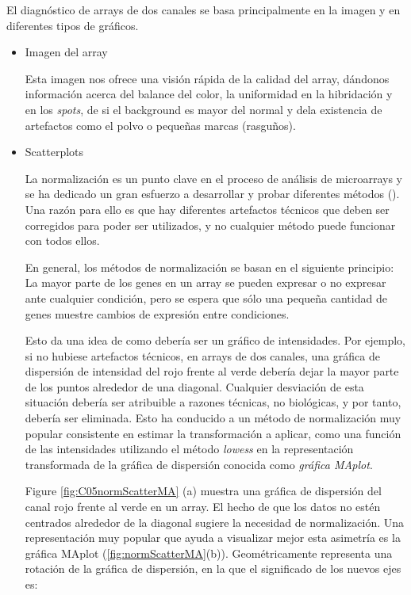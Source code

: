 El diagn\'ostico de arrays de dos canales se basa principalmente
en la imagen y en diferentes tipos de gr\'aficos.

\begin{itemize}
 \item Imagen del array

Esta imagen nos ofrece una visi\'on r\'apida de la calidad del array, d\'andonos informaci\'on
acerca del balance del color, la uniformidad en la hibridaci\'on y en los \emph{spots},
de si el background es mayor del normal y dela existencia de artefactos como el polvo o peque\~nas marcas (rasgu\~nos).

\item Scatterplots

La normalizaci\'on es un punto clave en el proceso de an\'alisis de microarrays y
se ha dedicado un gran esfuerzo a desarrollar y probar diferentes m\'etodos
(\cite{Quackenbush:2003,Yang:2002a}). Una raz\'on para ello es que hay
diferentes artefactos t\'ecnicos que deben ser corregidos para poder ser
utilizados, y no cualquier m\'etodo puede funcionar con todos ellos.

En general, los m\'etodos de normalizaci\'on se basan en el siguiente principio: La
mayor parte de los genes en un array se pueden expresar o no expresar ante
cualquier condici\'on, pero se espera que s\'olo  una peque\~na cantidad de genes muestre cambios de
expresi\'on entre condiciones.

Esto da una idea de como deber\'ia ser un gr\'afico de intensidades. Por ejemplo, si
no hubiese artefactos t\'ecnicos, en arrays de dos canales, una gr\'afica de
dispersi\'on de intensidad del rojo frente al verde deber\'ia dejar la mayor parte
de los puntos alrededor de una diagonal. Cualquier desviaci\'on de esta situaci\'on
deber\'ia ser atribuible a razones t\'ecnicas, no biol\'ogicas, y por tanto, deber\'ia
ser eliminada. Esto ha conducido a un m\'etodo de normalizaci\'on muy popular
consistente en estimar la transformaci\'on a aplicar, como una funci\'on de las
intensidades utilizando el m\'etodo \emph{lowess} en la representaci\'on transformada de la
gr\'afica de dispersi\'on conocida como \emph{gr\'afica MAplot}.

Figure \ref{fig:C05normScatterMA} (a) muestra una gr\'afica de dispersi\'on del canal
rojo frente al verde en un array. El hecho de que los
datos no est\'en centrados alrededor de la diagonal sugiere la necesidad de
normalizaci\'on. Una representaci\'on muy popular que ayuda a visualizar mejor esta
asimetr\'ia es la gr\'afica MAplot
(\ref{fig:normScatterMA}(b)). Geom\'etricamente representa una rotaci\'on de la
gr\'afica de dispersi\'on, en la que el significado de los nuevos ejes es:


\end{itemize}
